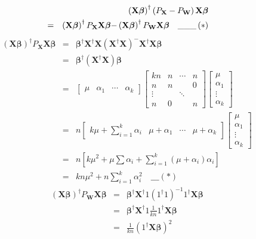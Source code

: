 \documentclass{article}
\begin{document}
\begin{eqnarray*}
&&\left( \mathbf{X\beta }\right) ^{\dagger }\left( P_{\mathbf{X}}-P_{\mathbf{%
W}}\right) \mathbf{X\beta } \\
&=&\left( \mathbf{X\beta }\right) ^{\dagger }P_{\mathbf{X}}\mathbf{X\beta -}%
\left( \mathbf{X\beta }\right) ^{\dagger }P_{\mathbf{W}}\mathbf{X\beta \quad
\_\_\_}\left( \ast \right) 
\end{eqnarray*}%
\begin{eqnarray*}
\left( \mathbf{X\beta }\right) ^{\dagger }P_{\mathbf{X}}\mathbf{X\beta } &=&%
\mathbf{\mathbf{\beta }^{\dagger }\mathbf{X^{\dagger }}X}\left( \mathbf{X}%
^{\dagger }\mathbf{X}\right) ^{-}\mathbf{X}^{\dagger }\mathbf{X\beta } \\
&=&\mathbf{\mathbf{\beta }^{\dagger }}\left( \mathbf{\mathbf{X^{\dagger }}X}%
\right) \mathbf{\beta } \\
&=&\left[ 
\begin{array}{cccc}
\mu  & \alpha _{1} & \cdots  & \alpha _{k}%
\end{array}%
\right] \left[ 
\begin{array}{cccc}
kn & n & \cdots  & n \\ 
n & n &  & 0 \\ 
\vdots  &  & \ddots  &  \\ 
n & 0 &  & n%
\end{array}%
\right] \left[ 
\begin{array}{c}
\mu  \\ 
\alpha _{1} \\ 
\vdots  \\ 
\alpha _{k}%
\end{array}%
\right]  \\
&=&n\left[ 
\begin{array}{cccc}
k\mu +\sum\limits_{i=1}^{k}\alpha _{i} & \mu +\alpha _{1} & \cdots  & \mu
+\alpha _{k}%
\end{array}%
\right] \left[ 
\begin{array}{c}
\mu  \\ 
\alpha _{1} \\ 
\vdots  \\ 
\alpha _{k}%
\end{array}%
\right]  \\
&=&n\left[ k\mu ^{2}+\mu \sum \alpha _{i}+\sum\limits_{i=1}^{k}\left( \mu
+\alpha _{i}\right) \alpha _{i}\right]  \\
&=&kn\mu ^{2}+n\sum_{i=1}^{k}\alpha _{i}^{2}\mathbf{\quad \_\_\_}\left( \ast
\right) 
\end{eqnarray*}%
\begin{eqnarray*}
\left( \mathbf{X\beta }\right) ^{\dagger }P_{\mathbf{W}}\mathbf{X\beta } &=&%
\mathbf{\mathbf{\beta }^{\dagger }\mathbf{X^{\dagger }}}1\left( 1^{\dagger
}1\right) ^{-1}1^{\dagger }\mathbf{X\beta } \\
&=&\mathbf{\mathbf{\beta }^{\dagger }\mathbf{X^{\dagger }}}1\frac{1}{kn}%
1^{\dagger }\mathbf{X\beta } \\
&=&\frac{1}{kn}\left( 1^{\dagger }\mathbf{X\beta }\right) ^{2}
\end{eqnarray*}
\end{document}
